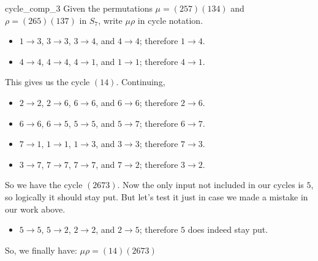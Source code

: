 \begin{example}{cycle_comp_3}
Given the permutations $\mu = (257)(134)$ and $\rho = (265)(137)$ in $S_7$, write $\mu \rho$ in cycle notation.


%
%
%
%
%

\begin{itemize}
\item
$1 \to 3$, $3 \to 3$, $3 \to 4$, and $4 \to 4$; therefore $1 \to 4$.
\item
$4 \to 4$, $4 \to 4$, $4 \to 1$, and $1 \to 1$; therefore $4 \to 1$. 
\end{itemize}

\noindent
This gives us the cycle $(14)$.  Continuing,
\begin{itemize}
\item
$2 \to 2$, $2 \to 6$, $6 \to 6$, and $6 \to 6$; therefore $2 \to 6$.
\item
$6 \to 6$, $6 \to 5$, $5 \to 5$, and $5 \to 7$; therefore $6 \to 7$.
\item
$7 \to 1$, $1 \to 1$, $1 \to 3$, and $3 \to 3$; therefore $7 \to 3$.
\item
$3 \to 7$, $7 \to 7$, $7 \to 7$, and $7 \to 2$; therefore $3 \to 2$.
\end{itemize}

\noindent
So we have the cycle  $(2673)$.  Now the only input not included in our cycles is $5$, so logically it should stay put.  But let's test it just in case we made a mistake in our work above.
\begin{itemize}
\item
$5 \to 5$, $5 \to 2$, $2 \to 2$, and $2 \to 5$; therefore $5$ does indeed stay put.
\end{itemize}

\noindent
So, we finally have:  $\mu \rho = (14)(2673)$
\end{example}

